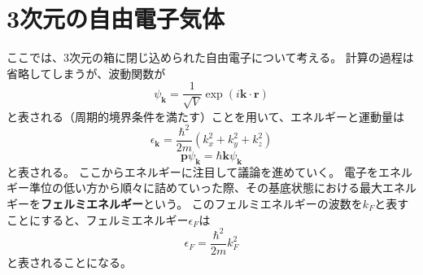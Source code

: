 \documentclass[a4paper]{jsreport}
\begin{document}
        \section{3次元の自由電子気体}
             ここでは、3次元の箱に閉じ込められた自由電子について考える。
             計算の過程は省略してしまうが、波動関数が
             \begin{equation}
                \psi_{\boldsymbol{k}} = \frac{1}{\sqrt{V}} \exp(i\boldsymbol{k} \cdot \boldsymbol{r})
             \end{equation}
             と表される（周期的境界条件を満たす）ことを用いて、エネルギーと運動量は
             \begin{equation}
                \epsilon_{\boldsymbol{k}} = \frac{\hbar^2}{2m} \left(k_x^2 + k_y^2 + k_z^2 \right)
             \end{equation}
             \begin{equation}
                \boldsymbol{p}\psi_{\boldsymbol{k}} = \hbar \boldsymbol{k}\psi_{\boldsymbol{k}}
             \end{equation}
             と表される。
             ここからエネルギーに注目して議論を進めていく。
             電子をエネルギー準位の低い方から順々に詰めていった際、その基底状態における最大エネルギーを\textbf{フェルミエネルギー}という。
             このフェルミエネルギーの波数を$k_F$と表すことにすると、フェルミエネルギー$\epsilon_F$は
             \begin{equation}
                \epsilon_F = \frac{\hbar^2}{2m} k_F^2
             \end{equation}
             と表されることになる。
\end{document}
